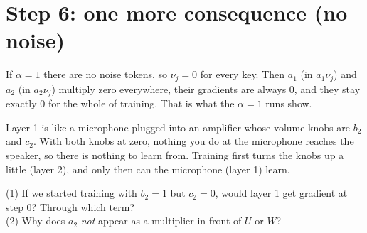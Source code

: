 \documentclass[11pt]{article}
\begin{document}
\section{Step 6: one more consequence (no noise)}
If $\alpha=1$ there are no noise tokens, so $\nu_j=0$ for every key. Then $a_1$ (in $a_1\nu_j$) and $a_2$ (in
$a_2\nu_j$) multiply zero everywhere, their gradients are always $0$, and they stay exactly $0$ for the
whole of training. That is what the $\alpha=1$ runs show.

\begin{idea}
Layer 1 is like a microphone plugged into an amplifier whose volume knobs are $b_2$ and $c_2$. With
both knobs at zero, nothing you do at the microphone reaches the speaker, so there is nothing to learn
from. Training first turns the knobs up a little (layer 2), and only then can the microphone (layer 1)
learn.
\end{idea}

\begin{quickcheck}
(1) If we started training with $b_2=1$ but $c_2=0$, would layer 1 get gradient at step 0? Through
which term?\\
(2) Why does $a_2$ \emph{not} appear as a multiplier in front of $U$ or $W$?
\end{quickcheck}
\end{document}
